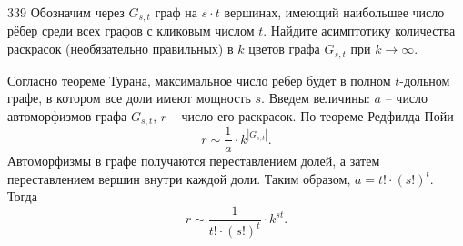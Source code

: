 \begin{task}{339}
Обозначим через $G_{s, t}$ граф на $s \cdot t$ вершинах, имеющий наибольшее число рёбер среди всех графов с кликовым числом $t$. Найдите асимптотику количества раскрасок (необязательно правильных) в $k$ цветов графа $G_{s, t}$ при $k \rightarrow \infty$.
\end{task}

\begin{solution}
Согласно теореме Турана, максимальное число ребер будет в полном $t$-дольном графе, в котором все доли имеют мощность $s$. Введем величины: $a$ -- число автоморфизмов графа $G_{s, t}$, $r$ -- число его раскрасок. По теореме Редфилда-Пойи \[r \sim \frac{1}{a} \cdot k^{|G_{s, t}|}.\]
Автоморфизмы в графе получаются переставлением долей, а затем переставлением вершин внутри каждой доли. Таким образом, $a=t!\cdot (s!)^t$. Тогда \[r \sim \frac{1}{t!\cdot (s!)^t} \cdot k^{st}.\]
\end{solution}